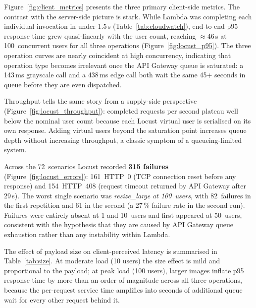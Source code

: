 \documentclass[10pt,twocolumn]{article}
\begin{document}
Figure~\ref{fig:client_metrics} presents the three primary client-side metrics.
The contrast with the server-side picture is stark. While Lambda was completing
each individual invocation in under 1.5\,s (Table~\ref{tab:cloudwatch}),
end-to-end p95 response time grew quasi-linearly with the user count, reaching
$\approx$46\,s at 100~concurrent users for all three operations
(Figure~\ref{fig:locust_p95}). The three operation curves are nearly coincident
at high concurrency, indicating that operation type becomes irrelevant once the
API Gateway queue is saturated: a 143\,ms grayscale call and a 438\,ms edge
call both wait the same 45+ seconds in queue before they are even dispatched.

Throughput tells the same story from a supply-side perspective
(Figure~\ref{fig:locust_throughput}): completed requests per second plateau well
below the nominal user count because each Locust virtual user is serialised on
its own response. Adding virtual users beyond the saturation point increases
queue depth without increasing throughput, a classic symptom of a
queueing-limited system.

Across the 72~scenarios Locust recorded \textbf{315 failures}
(Figure~\ref{fig:locust_errors}): 161~HTTP~0 (TCP connection reset before any
response) and 154~HTTP~408 (request timeout returned by API Gateway after
29\,s). The worst single scenario was \textit{resize\_large at 100~users}, with
82~failures in the first repetition and 61 in the second (a 27\,\% failure
rate in the second run). Failures were entirely absent at 1 and 10~users and
first appeared at 50~users, consistent with the hypothesis that they are caused
by API Gateway queue exhaustion rather than any instability within Lambda.

The effect of payload size on client-perceived latency is summarised in
Table~\ref{tab:size}. At moderate load (10 users) the size effect is mild and
proportional to the payload; at peak load (100 users), larger images inflate
p95 response time by more than an order of magnitude across all three
operations, because the per-request service time amplifies into seconds of
additional queue wait for every other request behind it.
\end{document}
